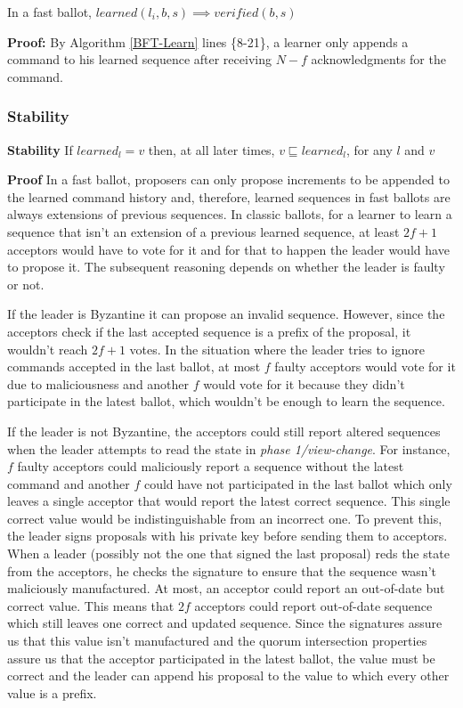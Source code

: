 \begin{lemma}
In a fast ballot, $learned(l_i,b,s) \implies verified(b,s)$ \label{C-L4} \par
\end{lemma}

\textbf{Proof:} By Algorithm \ref{BFT-Learn} lines \{8-21\}, a learner only appends a command to his learned sequence after receiving $N-f$ acknowledgments for the command. 



\subsubsection{Stability}
\textbf{Stability} If $learned_l = v$ then, at all later times, $v \sqsubseteq learned_l$, for any $l$ and $v$\par
\textbf{Proof} In a fast ballot, proposers can only propose increments to be appended to the learned command history and, therefore, learned sequences in fast ballots are always extensions of previous sequences. In classic ballots, for a learner to learn a sequence that isn't an extension of a previous learned sequence, at least $2f+1$ acceptors would have to vote for it and for that to happen the leader would have to propose it. The subsequent reasoning depends on whether the leader is faulty or not.\par
If the leader is Byzantine it can propose an invalid sequence. However, since the acceptors check if the last accepted sequence is a prefix of the proposal, it wouldn't reach $2f+1$ votes. In the situation where the leader tries to ignore commands accepted in the last ballot, at most $f$ faulty acceptors would vote for it due to maliciousness and another $f$ would vote for it because they didn't participate in the latest ballot, which wouldn't be enough to learn the sequence. \par
If the leader is not Byzantine, the acceptors could still report altered sequences when the leader attempts to read the state in \textit{phase 1/view-change}. For instance, $f$ faulty acceptors could maliciously report a sequence without the latest command and another $f$ could have not participated in the last ballot which only leaves a single acceptor that would report the latest correct sequence. This single correct value would be indistinguishable from an incorrect one. To prevent this, the leader signs proposals with his private key before sending them to acceptors. When a leader (possibly not the one that signed the last proposal) reds the state from the acceptors, he checks the signature to ensure that the sequence wasn't maliciously manufactured. At most, an acceptor could report an out-of-date but correct value. This means that $2f$ acceptors could report out-of-date sequence which still leaves one correct and updated sequence. Since the signatures assure us that this value isn't manufactured and the quorum intersection properties assure us that the acceptor participated in the latest ballot, the value must be correct and the leader can append his proposal to the value to which every other value is a prefix.